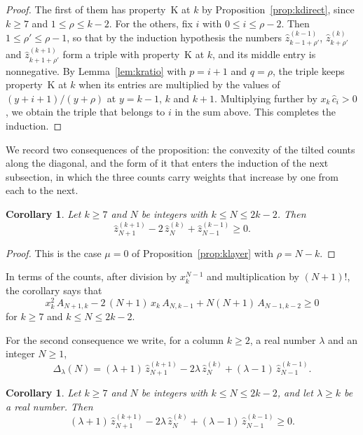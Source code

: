 \documentclass{amsart}
\newtheorem{corollary}[theorem]{Corollary}
\theoremstyle{definition}
\theoremstyle{remark}
\numberwithin{equation}{section}
\begin{document}
\begin{proof}
The first of them has property~K at $k$ by Proposition~\ref{prop:kdirect}, since $k\ge 7$ and $1\le\rho\le k-2$. For the others, fix $i$ with $0\le i\le\rho-2$. Then $1\le\rho'\le\rho-1$, so that by the induction hypothesis the numbers $\hat z^{(k-1)}_{k-1+\rho'}$, $\hat z^{(k)}_{k+\rho'}$ and $\hat z^{(k+1)}_{k+1+\rho'}$ form a triple with property~K at $k$, and its middle entry is nonnegative. By Lemma~\ref{lem:kratio} with $p=i+1$ and $q=\rho$, the triple keeps property~K at $k$ when its entries are multiplied by the values of $(y+i+1)/(y+\rho)$ at $y=k-1$, $k$ and $k+1$. Multiplying further by $x_k\,\hat c_i>0$, we obtain the triple that belongs to $i$ in the sum above. This completes the induction.
\end{proof}

We record two consequences of the proposition: the convexity of the tilted counts along the diagonal, and the form of it that enters the induction of the next subsection, in which the three counts carry weights that increase by one from each to the next.

\begin{corollary}\label{cor:layerconvex}
Let $k\ge 7$ and $N$ be integers with $k\le N\le 2k-2$. Then
\[
\hat z^{(k+1)}_{N+1}-2\,\hat z^{(k)}_N+\hat z^{(k-1)}_{N-1}\ge 0.
\]
\end{corollary}

\begin{proof}
This is the case $\mu=0$ of Proposition~\ref{prop:klayer} with $\rho=N-k$.
\end{proof}

In terms of the counts, after division by $x_k^{N-1}$ and multiplication by $(N+1)!$, the corollary says that
\[
x_k^{2}\,A_{N+1,k}-2\,(N+1)\,x_k\,A_{N,k-1}+N(N+1)\,A_{N-1,k-2}\ge 0
\]
for $k\ge 7$ and $k\le N\le 2k-2$.

For the second consequence we write, for a column $k\ge 2$, a real number $\lambda$ and an integer $N\ge 1$,
\begin{equation}\label{eq:layer-weighted}
\Delta_\lambda(N)=(\lambda+1)\,\hat z^{(k+1)}_{N+1}-2\lambda\,\hat z^{(k)}_N+(\lambda-1)\,\hat z^{(k-1)}_{N-1}.
\end{equation}

\begin{corollary}\label{cor:layerweighted}
Let $k\ge 7$ and $N$ be integers with $k\le N\le 2k-2$, and let $\lambda\ge k$ be a real number. Then
\[
(\lambda+1)\,\hat z^{(k+1)}_{N+1}-2\lambda\,\hat z^{(k)}_N+(\lambda-1)\,\hat z^{(k-1)}_{N-1}\ge 0.
\]
\end{corollary}
\end{document}
